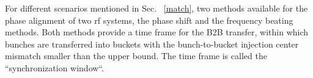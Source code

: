 
For different scenarios mentioned in Sec. ~\ref{match}, two methods available for the phase alignment of two rf systems, the phase shift and the frequency beating methods. Both methods provide a time frame for the B2B transfer, within which bunches are transferred into buckets with the bunch-to-bucket injection center mismatch smaller than the upper bound. The time frame is called the ``synchronization window``. 

